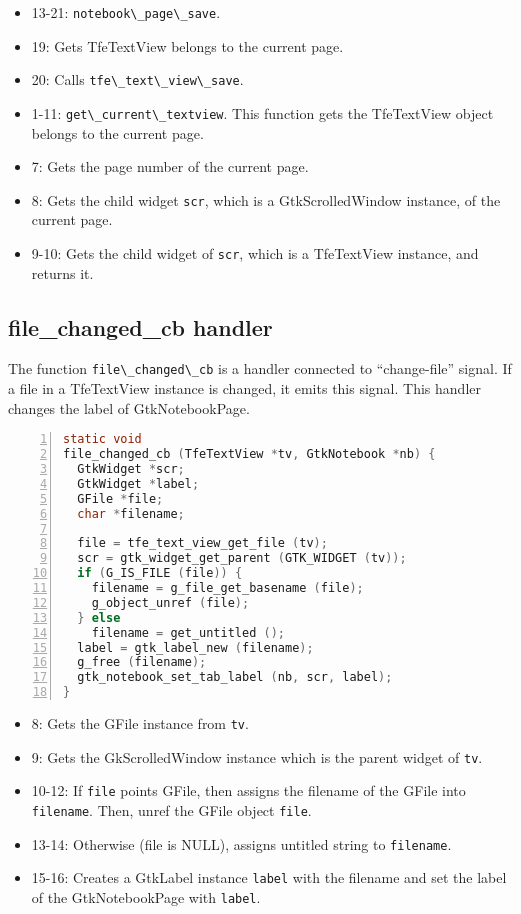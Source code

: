 \begin{itemize}
\tightlist
\item
  13-21: \passthrough{\lstinline!notebook\_page\_save!}.
\item
  19: Gets TfeTextView belongs to the current page.
\item
  20: Calls \passthrough{\lstinline!tfe\_text\_view\_save!}.
\item
  1-11: \passthrough{\lstinline!get\_current\_textview!}. This function
  gets the TfeTextView object belongs to the current page.
\item
  7: Gets the page number of the current page.
\item
  8: Gets the child widget \passthrough{\lstinline!scr!}, which is a
  GtkScrolledWindow instance, of the current page.
\item
  9-10: Gets the child widget of \passthrough{\lstinline!scr!}, which is
  a TfeTextView instance, and returns it.
\end{itemize}

\hypertarget{file_changed_cb-handler}{%
\subsection{file\_changed\_cb handler}\label{file_changed_cb-handler}}

The function \passthrough{\lstinline!file\_changed\_cb!} is a handler
connected to ``change-file'' signal. If a file in a TfeTextView instance
is changed, it emits this signal. This handler changes the label of
GtkNotebookPage.

\begin{lstlisting}[language=C, numbers=left]
static void
file_changed_cb (TfeTextView *tv, GtkNotebook *nb) {
  GtkWidget *scr;
  GtkWidget *label;
  GFile *file;
  char *filename;

  file = tfe_text_view_get_file (tv);
  scr = gtk_widget_get_parent (GTK_WIDGET (tv));
  if (G_IS_FILE (file)) {
    filename = g_file_get_basename (file);
    g_object_unref (file);
  } else
    filename = get_untitled ();
  label = gtk_label_new (filename);
  g_free (filename);
  gtk_notebook_set_tab_label (nb, scr, label);
}
\end{lstlisting}

\begin{itemize}
\tightlist
\item
  8: Gets the GFile instance from \passthrough{\lstinline!tv!}.
\item
  9: Gets the GkScrolledWindow instance which is the parent widget of
  \passthrough{\lstinline!tv!}.
\item
  10-12: If \passthrough{\lstinline!file!} points GFile, then assigns
  the filename of the GFile into \passthrough{\lstinline!filename!}.
  Then, unref the GFile object \passthrough{\lstinline!file!}.
\item
  13-14: Otherwise (file is NULL), assigns untitled string to
  \passthrough{\lstinline!filename!}.
\item
  15-16: Creates a GtkLabel instance \passthrough{\lstinline!label!}
  with the filename and set the label of the GtkNotebookPage with
  \passthrough{\lstinline!label!}.
\end{itemize}
